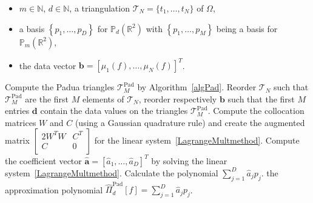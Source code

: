 \documentclass{svjour3}
\newcommand{\T}{\mathcal{T}}
\renewcommand{\P}{\mathbb{P}} %
\begin{document}
\begin{algorithm}[h!]
	\caption{histopolation-regression operators}
	\begin{algorithmic}[1]
		\Require \begin{itemize}
		    \item[a)] $m\in\mathbb{N}$,  $d\in\mathbb{N}$, a triangulation $\mathcal{T}_N= \{t_1,\dots,t_N\}$ of $ \Omega $,
            \item[b)] a basis $ \left\{p_1, \dots,p_D \right\}$ for $ \P_d \left(\mathbb{R}^2\right) $ with $\left\{p_1,\dots,p_M\right\}$ being a basis for $\mathbb{P}_m\left(\mathbb{R}^2\right)$,
            \item[c)] the data vector $\boldsymbol{b} = [\mu_1(f), \ldots, \mu_N(f)]^T$.
		\end{itemize}

\vspace{2mm}
        \State Compute the Padua triangles $\T_M^{\mathrm{Pad}}$ by Algorithm~\ref{algPad}.
        \State Reorder $\mathcal{T}_N$ such that $\T_M^{\mathrm{Pad}}$ are the first $M$ elements of $\mathcal{T}_N$, reorder respectively $\boldsymbol{b}$ such that the first $M$ entries $\boldsymbol{d}$ contain the data values on the triangles $\T_M^{\mathrm{Pad}}$.  
        \State Compute the collocation matrices $ W $ and $ C $ (using a Gaussian quadrature rule)
		and create the augmented matrix $\begin{bmatrix}
		2 W^T W & C^T  \\
		C & 0  \\
	\end{bmatrix}$ for the linear system~\eqref{LagrangeMultmethod}.
		\State Compute the coefficient vector $\hat{\boldsymbol{a}}=\left[\hat{a}_1,\dots,\hat{a}_D\right]^T$ by solving the linear system~\eqref{LagrangeMultmethod}.
		\State Calculate the polynomial $\sum\limits_{j=1}^D \hat{a}_j p_j$.
        \Ensure the approximation polynomial  $\hat{\Pi}_d^{\mathrm{Pad}}[f] = \sum\limits_{j=1}^D \hat{a}_j p_j$.
	\end{algorithmic}
	\label{algfinal}
\end{algorithm}
\end{document}
